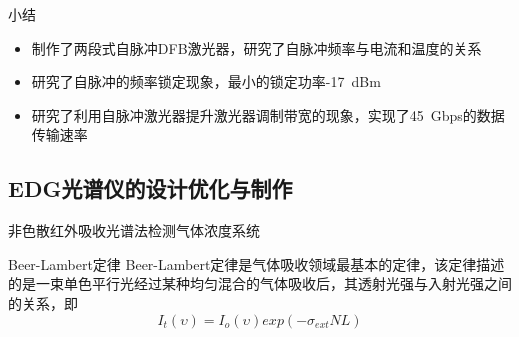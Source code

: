 \documentclass{beamer}
\begin{document}
\begin{frame}{小结}
\begin{itemize}
	\item 制作了两段式自脉冲DFB激光器，研究了自脉冲频率与电流和温度的关系
	\item 研究了自脉冲的频率锁定现象，最小的锁定功率-17~dBm
	\item 研究了利用自脉冲激光器提升激光器调制带宽的现象，实现了45~Gbps的数据传输速率
\end{itemize}
\end{frame}

\subsection{\mbox{EDG}光谱仪的设计优化与制作}
\frame{\tableofcontents[currentsubsection]}
\begin{frame}[t]{非色散红外吸收光谱法检测气体浓度系统}
\begin{block}{Beer-Lambert定律}
	Beer-Lambert定律是气体吸收领域最基本的定律，该定律描述的是一束单色平行光经过某种均匀混合的气体吸收后，其透射光强与入射光强之间的关系，即
	\begin{equation*}
		I_{t}(\upsilon) = I_{o}(\upsilon)exp(-\sigma_{ext}NL)
	\end{equation*}
\end{block}
\centering
{}
\end{frame}
\end{document}
